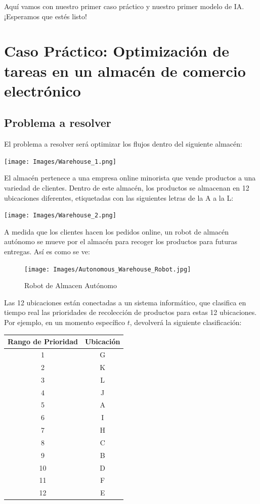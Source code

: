 \documentclass[
]{book}
\begin{document}
Aquí vamos con nuestro primer caso práctico y nuestro primer modelo de IA. ¡Esperamos que estés listo!

\hypertarget{caso-pruxe1ctico-optimizaciuxf3n-de-tareas-en-un-almacuxe9n-de-comercio-electruxf3nico}{%
\section{Caso Práctico: Optimización de tareas en un almacén de comercio electrónico}\label{caso-pruxe1ctico-optimizaciuxf3n-de-tareas-en-un-almacuxe9n-de-comercio-electruxf3nico}}

\hypertarget{problema-a-resolver}{%
\subsection{Problema a resolver}\label{problema-a-resolver}}

El problema a resolver será optimizar los flujos dentro del siguiente almacén:

\texttt{[image: Images/Warehouse\_1.png]}

El almacén pertenece a una empresa online minorista que vende productos a una variedad de clientes. Dentro de este almacén, los productos se almacenan en 12 ubicaciones diferentes, etiquetadas con las siguientes letras de la A a la L:

\texttt{[image: Images/Warehouse\_2.png]}

A medida que los clientes hacen los pedidos online, un robot de almacén autónomo se mueve por el almacén para recoger los productos para futuras entregas. Así es como se ve:

\begin{figure}
\centering
\texttt{[image: Images/Autonomous\_Warehouse\_Robot.jpg]}
\caption{Robot de Almacen Autónomo}
\end{figure}

Las 12 ubicaciones están conectadas a un sistema informático, que clasifica en tiempo real las prioridades de recolección de productos para estas 12 ubicaciones. Por ejemplo, en un momento específico \(t\), devolverá la siguiente clasificación:

\begin{longtable}[]{@{}cc@{}}
\toprule()
\textbf{Rango de Prioridad} & \textbf{Ubicación} \\
\midrule()
\endhead
1 & G \\
2 & K \\
3 & L \\
4 & J \\
5 & A \\
6 & I \\
7 & H \\
8 & C \\
9 & B \\
10 & D \\
11 & F \\
12 & E \\
\bottomrule()
\end{longtable}
\end{document}
